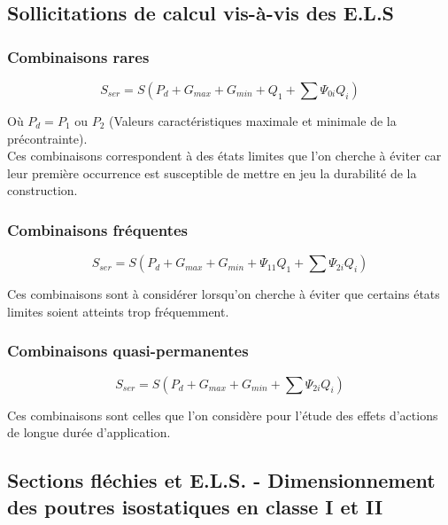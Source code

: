 \documentclass[12pt,a4paper]{article}
\begin{document}
\subsection{Sollicitations de calcul vis-à-vis des E.L.S}

\subsubsection{Combinaisons rares}

\begin{equation}
S_{ser} = S(P_d + G_{max} + G_{min} + Q_1 + \sum \Psi_{0i} Q_i)
\end{equation}

Où $P_d = P_1$ ou $P_2$ (Valeurs caractéristiques maximale et minimale de la précontrainte).\\
Ces combinaisons correspondent à des états limites que l'on cherche à éviter car leur première occurrence est susceptible de mettre en jeu la durabilité de la construction.

\subsubsection{Combinaisons fréquentes}

\begin{equation}
S_{ser} = S(P_d + G_{max} + G_{min} + \Psi_{11} Q_1 + \sum \Psi_{2i} Q_i)
\end{equation}

Ces combinaisons sont à considérer lorsqu'on cherche à éviter que certains états limites soient atteints trop fréquemment.

\subsubsection{Combinaisons quasi-permanentes}

\begin{equation}
S_{ser} = S(P_d + G_{max} + G_{min} + \sum \Psi_{2i} Q_i)
\end{equation}

Ces combinaisons sont celles que l'on considère pour l'étude des effets d'actions de longue durée d'application.

\subsection{Sections fléchies et E.L.S. - Dimensionnement des poutres isostatiques en classe I et II}
\end{document}
